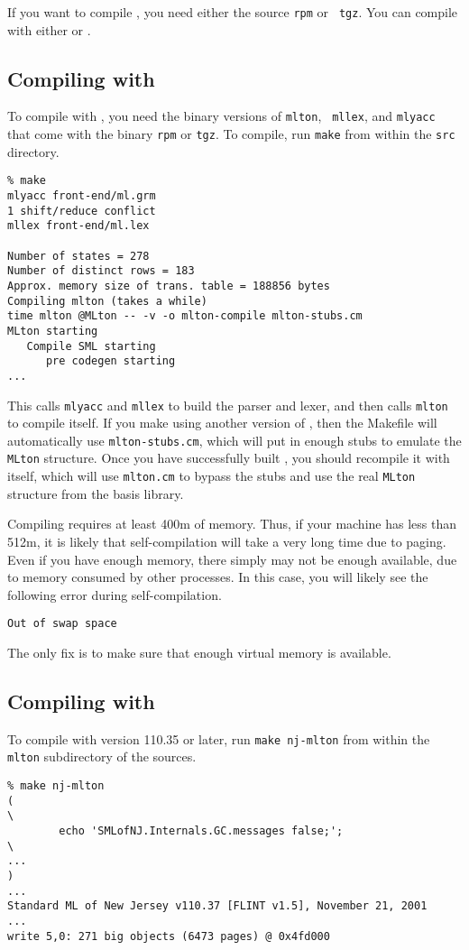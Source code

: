 
If you want to compile {\mlton}, you need either the source {\tt rpm} or {\tt
tgz}.  You can compile with either {\mlton} or {\smlnj}.

\subsection{Compiling with {\mlton}}

To compile with {\mlton}, you need the binary versions of {\tt mlton}, {\tt
mllex}, and {\tt mlyacc} that come with the binary {\tt rpm} or {\tt tgz}.  To
compile, run {\tt make} from within the {\tt src} directory.
\begin{verbatim}
% make
mlyacc front-end/ml.grm
1 shift/reduce conflict
mllex front-end/ml.lex

Number of states = 278
Number of distinct rows = 183
Approx. memory size of trans. table = 188856 bytes
Compiling mlton (takes a while)
time mlton @MLton -- -v -o mlton-compile mlton-stubs.cm
MLton starting
   Compile SML starting
      pre codegen starting
...
\end{verbatim}
This calls {\tt mlyacc} and {\tt mllex} to build the parser and lexer, and then
calls {\tt mlton} to compile itself.  If you make {\mlton} using another version
of {\mlton}, then the Makefile will automatically use {\tt mlton-stubs.cm},
which will put in enough stubs to emulate the {\tt MLton} structure.  Once you
have successfully built {\mlton}, you should recompile it with itself, which
will use {\tt mlton.cm} to bypass the stubs and use the real {\tt MLton}
structure from the basis library.

Compiling {\mlton} requires at least 400m of memory.  Thus, if your machine has
less than 512m, it is likely that self-compilation will take a very long time
due to paging.  Even if you have enough memory, there simply may not be enough
available, due to memory consumed by other processes.  In this case, you will
likely see the following error during self-compilation.
\begin{verbatim}
Out of swap space
\end{verbatim}
The only fix is to make sure that enough virtual memory is available.

\subsection{Compiling with {\smlnj}}

To compile with {\smlnj} version 110.35 or later, run {\tt make nj-mlton} from
within the {\tt mlton} subdirectory of the sources.
\begin{verbatim}
% make nj-mlton
(                                                                       \
        echo 'SMLofNJ.Internals.GC.messages false;';                    \
...
)
...
Standard ML of New Jersey v110.37 [FLINT v1.5], November 21, 2001
...
write 5,0: 271 big objects (6473 pages) @ 0x4fd000
\end{verbatim}
